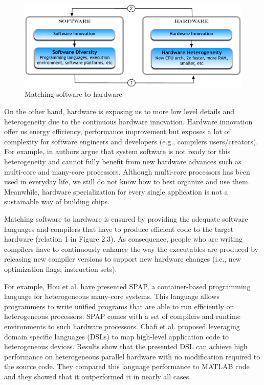 \begin{figure}[h]
	\center
	\includegraphics[scale=0.65]{Background/fig/marriage}
	\caption{Matching software to hardware}
\end{figure}

On the other hand, hardware is exposing us to more low level details and heterogeneity due to the continuous hardware innovation. 
Hardware innovation offer us energy efficiency, performance improvement but exposes a lot of complexity for software engineers and developers (e.g., compilers users/creators).
For example, in \cite{he2010computer} authors argue that system software is not ready for this heterogeneity and cannot fully benefit from new hardware advances such as multi-core and many-core processors. Although multi-core processors has been used in everyday life, we still do not know how to best organize and use them. 
Meanwhile, hardware specialization for every single application is not a sustainable way of building chips.

Matching software to hardware is ensured by providing the adequate software languages and compilers that have to produce efficient code to the target hardware (relation 1 in Figure 2.3). As consequence, people who are writing compilers have to continuously enhance the way the executables are produced by releasing new compiler versions to support new hardware changes (i.e., new optimization flags, instruction sets).

For example, Hou et al.\cite{hou2010spap} have presented SPAP, a container-based programming language for heterogeneous many-core systems. This language allows programmers to write unified programs that are able to run efficiently on heterogeneous processors. SPAP comes with a set of compilers and runtime environments to such hardware processors. Chafi et al.\cite{chafi2010language,chafi2011domain} proposed leveraging domain specific languages (DSLs) to map high-level application code to
heterogeneous devices. Results show that the presented DSL can achieve high performance on heterogeneous parallel hardware with no modification required to the source code. They compared this language performance to MATLAB code and they showed that it outperformed it in nearly all cases.

